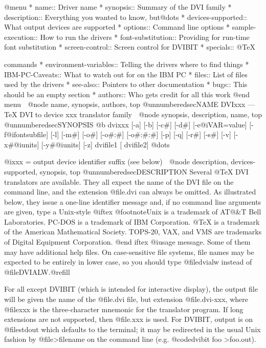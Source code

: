 @menu
* name::		Driver name
* synopsis::            Summary of the DVI family
* description::         Everything you wanted to know, but@dots{}
* devices-supported::   What output devices are supported
* options::             Command line options
* sample-execution::    How to run the drivers
* font-substitution::   Providing for run-time font substitution
* screen-control::      Screen control for DVIBIT
* specials::            @TeX{} \special commands
* environment-variables::       Telling the drivers where to find things
* IBM-PC-Caveats::      What to watch out for on the IBM PC
* files::               List of files used by the drivers
* see-also::            Pointers to other documentation
* bugs::                This should be an empty section
* authors::             Who gets credit for all this work
@end menu

@node name, synopsis, authors, top
@unnumberedsec{NAME}
DVIxxx --- TeX DVI to device xxx translator family

@node synopsis, description, name, top
@unnumberedsec{SYNOPSIS}
@b{
dvixxx [-a] [-b] [-c#] [-d#] [-e@i{VAR=value}] [-f@i{fontsubfile}]
       [-l] [-m#] [-o#] [-o#:#] [-o#:#:#] [-p] [-q] [-r#] [-s#] [-v]
       [-x#@i{units}] [-y#@i{units}] [-z] dvifile1 [ dvifile2] @dots{}
}

@i{xxx} = output device identifier suffix (see below)

@node description, devices-supported, synopsis, top
@unnumberedsec{DESCRIPTION}
Several @TeX{} DVI translators are available.  They all expect
the name of the DVI file on the command line, and the extension
@file{.dvi} can always be omitted.  As illustrated below, they
issue a one-line identifier message and, if no command line
arguments are given, type a Unix-style
@iftex
@footnote{Unix is a trademark of AT@&T Bell Laboratories.
PC-DOS is a trademark of IBM Corporation. @TeX{} is a trademark
of the American Mathematical Society. TOPS-20, VAX, and VMS
are trademarks of Digital Equipment Corporation.}
@end iftex
@i{usage} message.  Some of them may have additional help files.
On case-sensitive file systems, file names may be expected to be
entirely in lower case, so you should type @file{dvialw}
instead of @file{DVIALW}.@refill

For all except DVIBIT (which is intended for interactive
display), the output file will be given the name of the
@file{.dvi} file, but extension @file{.dvi-xxx}, where @file{xxx}
is the three-character mnemonic for the translator program.  If
long extensions are not supported, then @file{.xxx} is used.  For
DVIBIT, output is on @file{stdout} which defaults to the
terminal; it may be redirected in the usual Unix fashion by
@file{>filename} on the command line (e.g. @code{dvibit foo
>foo.out}).

